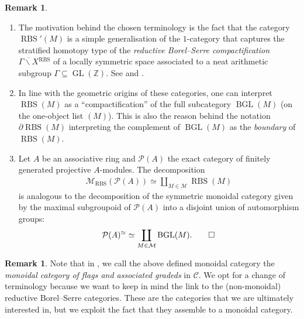 \documentclass[12pt, reqno]{amsart}
\theoremstyle{plain}
\theoremstyle{definition}
\newtheorem{remark}[theorem]{Remark}
\newcommand{\Z}{\mathbb Z}
\begin{document}
\begin{remark} \ 
\begin{enumerate}
\item The motivation behind the chosen terminology is the fact that the category $\operatorname{RBS}'(M)$ is a simple generalisation of the $1$-category that captures the stratified homotopy type of the \textit{reductive Borel--Serre compactification} $\overline{\Gamma\backslash X}{}^{\operatorname{RBS}}$ of a locally symmetric space associated to a neat arithmetic subgroup $\Gamma\subseteq\operatorname{GL}(\Z)$. See \cite{OrsnesJansen} and \cite[\S 4]{ClausenOrsnesJansen}.
\item In line with the geometric origins of these categories, one can interpret $\operatorname{RBS}(M)$ as a ``compactification'' of the full subcategory $\operatorname{BGL}(M)$ (on the one-object list $(M)$). This is also the reason behind the notation $\partial \operatorname{RBS}(M)$ interpreting the complement of $\operatorname{BGL}(M)$ as the \textit{boundary} of $\operatorname{RBS}(M)$.
\item Let $A$ be an associative ring and $\mathcal{P}(A)$ the exact category of finitely generated projective $A$-modules. The decomposition
\begin{align*}
\mathscr{M}_{\operatorname{RBS}}(\mathcal{P}(A))\simeq \coprod_{M\in \mathcal{M}}\operatorname{RBS}(M)
\end{align*}
is analogous to the decomposition of the symmetric monoidal category given by the maximal subgroupoid of $\mathcal{P}(A)$ into a disjoint union of automorphism groups:
\begin{equation*}
\mathcal{P}(A)^\simeq\simeq \coprod_{M\in \mathcal{M}}\operatorname{BGL}(M).\qedhere
\end{equation*}
\end{enumerate}




\end{remark}

\begin{remark}
Note that in \cite[\S 7]{ClausenOrsnesJansen}, we call the above defined monoidal category the \textit{monoidal category of flags and associated gradeds} in $\mathcal{C}$. We opt for a change of terminology because we want to keep in mind the link to the (non-monoidal) reductive Borel--Serre categories. These are the categories that we are ultimately interested in, but we exploit the fact that they assemble to a monoidal category.
\end{remark}
\end{document}
